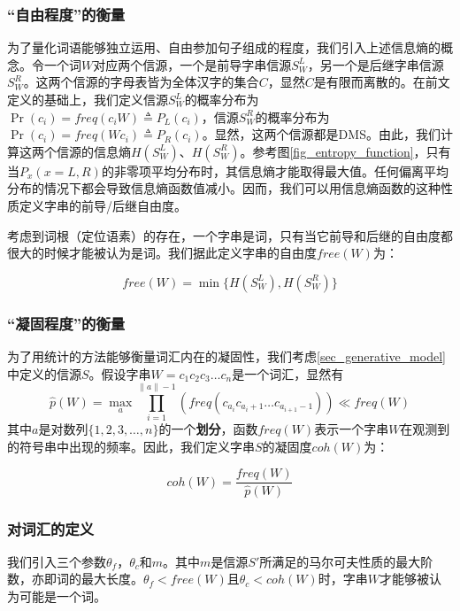 \documentclass[UTF8]{ctexart}
\begin{document}
\subsubsection{“自由程度”的衡量}
为了量化词语能够独立运用、自由参加句子组成的程度，我们引入上述信息熵的概念。令一个词$W$对应两个信源，一个是前导字串信源$S_W^L$，另一个是后继字串信源$S_W^R$。这两个信源的字母表皆为全体汉字的集合$C$，显然$C$是有限而离散的。在前文定义的基础上，我们定义信源$S_W^L$的概率分布为$\Pr(c_i) = freq(c_i W) \triangleq P_L(c_i)$，信源$S_W^R$的概率分布为$\Pr(c_i) = freq(W c_i) \triangleq P_R(c_i)$。显然，这两个信源都是DMS。由此，我们计算这两个信源的信息熵$H(S_W^L)$、$H(S_W^R)$。参考图\ref{fig_entropy_function}，只有当$P_x (x=L, R)$的非零项平均分布时，其信息熵才能取得最大值。任何偏离平均分布的情况下都会导致信息熵函数值减小。因而，我们可以用信息熵函数的这种性质定义字串的前导/后继自由度。

考虑到词根（定位语素）的存在，一个字串是词，只有当它前导和后继的自由度都很大的时候才能被认为是词。我们据此定义字串的自由度$free(W)$为：

\begin{equation}
free(W) = \min \{ H(S_W^L), H(S_W^R) \}
\label{eqn_def_free}
\end{equation}

\subsubsection{“凝固程度”的衡量}
为了用统计的方法能够衡量词汇内在的凝固性，我们考虑\ref{sec_generative_model}中定义的信源$S$。假设字串$W=c_1 c_2 c_3 \dots c_n$是一个词汇，显然有
\begin{equation}
\hat{p}(W) = \max\limits_{a}\prod\limits_{i=1}^{\|a\|-1} (freq(c_{a_i} c_{a_i+1} \dots c_{a_{i+1}-1})) \ll freq(W) 
\end{equation}
其中$a$是对数列$\{1,2,3,\dots,n\}$的一个\textbf{划分}，函数$freq(W)$表示一个字串$W$在观测到的符号串中出现的频率。因此，我们定义字串$S$的凝固度$coh(W)$为：

\begin{equation}
coh(W) = \frac{freq(W)}{\hat{p}(W)}
\label{eqn_def_coh}
\end{equation}

\subsubsection{对词汇的定义}
我们引入三个参数$\theta_f$，$\theta_c$和$m$。其中$m$是信源$S'$所满足的马尔可夫性质的最大阶数，亦即词的最大长度。$\theta_f < free(W)$且$\theta_c < coh(W)$时，字串$W$才能够被认为可能是一个词。
\end{document}
